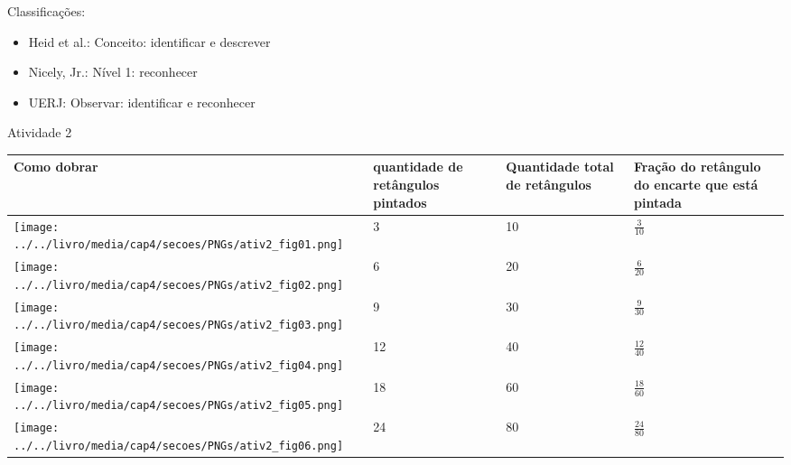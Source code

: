 \begin{multicols}{2}
  
  Classificações:  
\begin{itemize} %
    \item       Heid et al.: Conceito: identificar e descrever
    \item       Nicely, Jr.: Nível 1: reconhecer
    \item       UERJ: Observar: identificar e reconhecer
\end{itemize} %
  
  \end{multicols}
  \pagebreak
  
\begin{resposta*}{Atividade 2}
  
\noindent 
\begin{tabular}{|m{}|m{}|m{}|m{}|}
    \hline
      Como dobrar  &  quantidade de retângulos pintados  & Quantidade total de retângulos  &  Fração do retângulo do encarte que está pintada  \\
    \hline \hline   
       \texttt{[image: ../../livro/media/cap4/secoes/PNGs/ativ2\_fig01.png]} &  3 &  10 &  
$\frac{3}{10}$ \\
      \hline 
       \texttt{[image: ../../livro/media/cap4/secoes/PNGs/ativ2\_fig02.png]} &  6 &  20 &  
$\frac{6}{20}$ \\
      \hline 
       \texttt{[image: ../../livro/media/cap4/secoes/PNGs/ativ2\_fig03.png]} &  9 &  30 &  
$\frac{9}{30}$ \\
      \hline 
       \texttt{[image: ../../livro/media/cap4/secoes/PNGs/ativ2\_fig04.png]} &  12 &  40 &  
$\frac{12}{40}$ \\
      \hline 
      \texttt{[image: ../../livro/media/cap4/secoes/PNGs/ativ2\_fig05.png]}&  18 &  60 &  $\frac{18}{60}$ \\
      \hline 
      \texttt{[image: ../../livro/media/cap4/secoes/PNGs/ativ2\_fig06.png]}&  24 &  80 &  $\frac{24}{80}$ \\
      \hline 
    \end{tabular}
  
\end{resposta*}

\Bg

